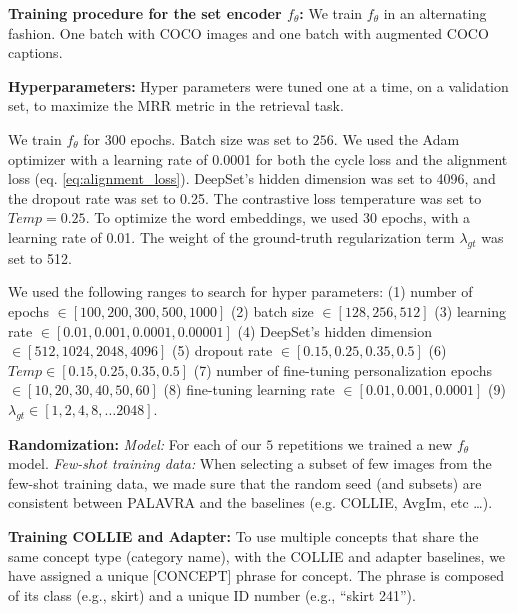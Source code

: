 \documentclass[runningheads]{llncs}
\newcommand{\ftheta}{f_\theta}
\newcommand{\concept}{[CONCEPT]}
\begin{document}
\vspace{15pt}\noindent\textbf{Training procedure for the set encoder $\ftheta$:}
We train $\ftheta$ in an alternating fashion. One batch with COCO images and one batch with augmented COCO captions.

\vspace{15pt}\noindent\textbf{Hyperparameters:}
Hyper parameters were tuned one at a time, on a validation set, to maximize the MRR metric in the retrieval task.

We train $\ftheta$ for 300 epochs. Batch size was set to $256$. We used the Adam \cite{kingma2014adam} optimizer with a learning rate of 0.0001 for both the cycle loss and the alignment loss (eq. \ref{eq:alignment_loss}). DeepSet's hidden dimension was set to 4096, and the dropout rate was set to 0.25. The contrastive loss temperature was set to $Temp=0.25$. To optimize the word embeddings, we used 30 epochs, with a learning rate of 0.01. The weight of the ground-truth regularization term $\lambda_{gt}$ was set to 512.

We used the following ranges to search for hyper parameters: (1) number of epochs $\in [100, 200, 300, 500, 1000]$ (2) batch size $\in [128, 256, 512]$ (3) learning rate  $\in [0.01, 0.001,  0.0001, 0.00001]$ (4) DeepSet's hidden dimension $\in [512, 1024, 2048, 4096]$ (5) dropout rate $\in [0.15, 0.25, 0.35, 0.5]$ (6) $Temp \in [0.15, 0.25, 0.35, 0.5]$ (7) number of fine-tuning personalization epochs $\in [10, 20, 30, 40, 50, 60]$ (8) fine-tuning learning rate $ \in [0.01, 0.001, 0.0001]$ (9) $\lambda_{gt} \in [1, 2, 4, 8, \dots 2048]$. 



\vspace{15pt}\noindent\textbf{Randomization:} \textit{Model:} For each of our $5$ repetitions we trained a new $\ftheta$ model. \textit{Few-shot training data:} When selecting a subset of few images from the few-shot training data, we made sure that the random seed (and subsets) are consistent between PALAVRA and the baselines (e.g. COLLIE, AvgIm, etc \dots ).


\vspace{15pt}\noindent\textbf{Training COLLIE and Adapter:}
To use multiple concepts that share the same concept type (category name), with the COLLIE and adapter baselines, we have assigned  a unique \concept{} phrase for concept. The phrase is composed of its class (e.g., skirt) and a unique ID number (e.g., ``skirt 241'').
\end{document}
